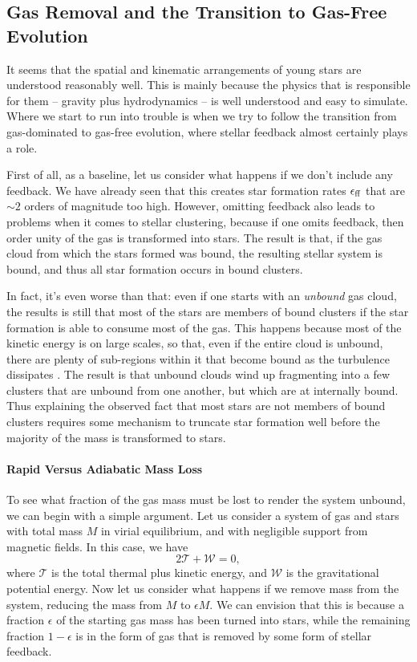 \subsection{Gas Removal and the Transition to Gas-Free Evolution}

It seems that the spatial and kinematic arrangements of young stars are understood reasonably well. This is mainly because the physics that is responsible for them -- gravity plus hydrodynamics -- is well understood and easy to simulate.  Where we start to run into trouble is when we try to follow the transition from gas-dominated to gas-free evolution, where stellar feedback almost certainly plays a role.

First of all, as a baseline, let us consider what happens if we don't include any feedback. We have already seen that this creates star formation rates $\epsilon_{\rm ff}$ that are $\sim 2$ orders of magnitude too high. However, omitting feedback also leads to problems when it comes to stellar clustering, because if one omits feedback, then order unity of the gas is transformed into stars. The result is that, if the gas cloud from which the stars formed was bound, the resulting stellar system is bound, and thus all star formation occurs in bound clusters.

In fact, it's even worse than that: even if one starts with an \textit{unbound} gas cloud, the results is still that most of the stars are members of bound clusters if the star formation is able to consume most of the gas. This happens because most of the kinetic energy is on large scales, so that, even if the entire cloud is unbound, there are plenty of sub-regions within it that become bound as the turbulence dissipates \citep{clark04a}. The result is that unbound clouds wind up fragmenting into a few clusters that are unbound from one another, but which are at internally bound. Thus explaining the observed fact that most stars are not members of bound clusters requires some mechanism to truncate star formation well before the majority of the mass is transformed to stars. 

\paragraph{Rapid Versus Adiabatic Mass Loss}

To see what fraction of the gas mass must be lost to render the system unbound, we can begin with a simple argument. Let us consider a system of gas and stars with total mass $M$ in virial equilibrium, and with negligible support from magnetic fields. In this case, we have
\begin{equation}
2\mathcal{T} + \mathcal{W} = 0,
\end{equation}
where $\mathcal{T}$ is the total thermal plus kinetic energy, and $\mathcal{W}$ is the gravitational potential energy. Now let us consider what happens if we remove mass from the system, reducing the mass from $M$ to $\epsilon M$. We can envision that this is because a fraction $\epsilon$ of the starting gas mass has been turned into stars, while the remaining fraction $1-\epsilon$ is in the form of gas that is removed by some form of stellar feedback.

